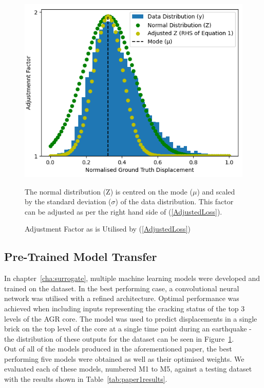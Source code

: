 \begin{figure}[h]
	\centering
	\includegraphics[scale=0.45]{Figures/norm_distr.png}
	\caption{Adjustment Factor as is Utilised by (\ref{AdjustedLoss})} {The normal distribution (Z) is centred on the mode ($\mu$) and scaled by the standard deviation ($\sigma$) of the data distribution. This factor can be adjusted as per the right hand side of (\ref{AdjustedLoss}).}
	\label{fig:adjustment}
\end{figure}

\subsection{Pre-Trained Model Transfer} \label{TransferModels}

In chapter~\ref{cha:surrogate}, multiple machine learning models were developed and trained on the dataset. In the best performing case, a convolutional neural network was utilised with a refined architecture. Optimal performance was achieved when including inputs representing the cracking status of the top 3 levels of the AGR core. The model was used to predict displacements in a single brick on the top level of the core at a single time point during an earthquake - the distribution of these outputs for the dataset can be seen in Figure~\ref{fig:adjustment}.  
\\

\noindent
Out of all of the models produced in the aforementioned paper, the best performing five models were obtained as well as their optimised weights. We evaluated each of these models, numbered M1 to M5, against a testing dataset with the results shown in Table~\ref{tab:paper1results}.

